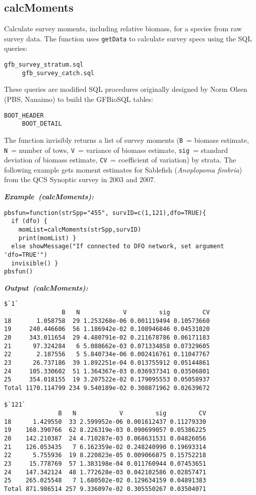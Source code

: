 \documentclass[letterpaper,12pt,fleqn]{article}
\def\tab{\hspace{0.5 in}}
\newcommand{\code}[1]{\small\texttt{#1}\normalsize}
\newcommand{\db}[1]{\small\textmd{\textsf{#1}}\normalsize}
\newcommand\example[1]{    %
	\textbf{\emph{Example~(#1):}}\\ \vspace{3 pt}
}
\newcommand\results[1]{    %
	\textbf{\emph{Output~(#1):}}\\ \vspace{3 pt}
}
\begin{document}
\subsection {calcMoments}

\tab Calculate survey moments, including relative biomass, for a species from raw survey data. The function uses \code{getData} to calculate survey specs using the SQL queries:
\begin{Verbatim}[fontsize=\footnotesize]
     gfb_survey_stratum.sql
     gfb_survey_catch.sql
\end{Verbatim}
These queries are modified SQL procedures originally designed by Norm Olsen (PBS, Nanaimo) to build the \db{GFBioSQL} tables:
\begin{Verbatim}[fontsize=\footnotesize]
     BOOT_HEADER
     BOOT_DETAIL
\end{Verbatim}
\tab The function invisibly returns a list of survey moments (\code{B}~= biomass estimate, \code{N}~= number of tows, \code{V}~= variance of biomass estimate, \code{sig}~= standard deviation of biomass estimate, \code{CV}~= coefficient of variation) by strata. The following example gets moment estimates for Sablefish (\emph{Anoplopoma fimbria}) from the QCS Synoptic survey in 2003 and 2007.

\begin{examplebox}
\example{calcMoments}
\begin{Verbatim}[fontsize=\footnotesize]
pbsfun=function(strSpp="455", survID=c(1,121),dfo=TRUE){
  if (dfo) {
    momList=calcMoments(strSpp,survID)
    print(momList) }
  else showMessage("If connected to DFO network, set argument 'dfo=TRUE'")
  invisible() }
pbsfun()
\end{Verbatim}
\end{examplebox}

\begin{outputbox}
\results{calcMoments}
\begin{Verbatim}[fontsize=\footnotesize]
$`1`
                B   N            V         sig         CV
18       1.058758  29 1.253268e-06 0.001119494 0.10573660
19     240.446606  56 1.186942e-02 0.108946846 0.04531020
20     343.011654  29 4.480791e-02 0.211678786 0.06171183
21      97.324284   6 5.088662e-03 0.071334858 0.07329605
22       2.187556   5 5.840734e-06 0.002416761 0.11047767
23      26.737186  39 1.892251e-04 0.013755912 0.05144861
24     105.330602  51 1.364367e-03 0.036937341 0.03506801
25     354.018155  19 3.207522e-02 0.179095553 0.05058937
Total 1170.114799 234 9.540189e-02 0.308871962 0.02639672

$`121`
               B   N            V         sig         CV
18      1.429550  33 2.599952e-06 0.001612437 0.11279330
19    168.390766  62 8.226319e-03 0.090699057 0.05386225
20    142.210387  24 4.710287e-03 0.068631531 0.04826056
21    126.053435   7 6.162359e-02 0.248240990 0.19693314
22      5.755936  19 8.220823e-05 0.009066875 0.15752218
23     15.778769  57 1.383198e-04 0.011760944 0.07453651
24    147.342124  48 1.772628e-03 0.042102586 0.02857471
25    265.025548   7 1.680502e-02 0.129634159 0.04891383
Total 871.986514 257 9.336097e-02 0.305550267 0.03504071
\end{Verbatim}
\end{outputbox}
\end{document}
